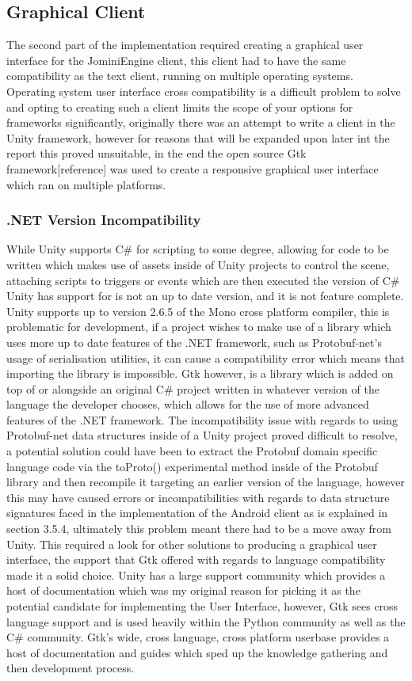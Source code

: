 \documentclass{article}
\begin{document}
\subsection{Graphical Client}
The second part of the implementation required creating a graphical user interface for the JominiEngine client, this client had to have the same compatibility as the text client, running on multiple operating systems. Operating system user interface cross compatibility is a difficult problem to solve and opting to creating such a client limits the scope of your options for frameworks significantly, originally there was an attempt to write a client in the Unity framework, however for reasons that will be expanded upon later int the report this proved unsuitable, in the end the open source Gtk framework[reference] was used to create a responsive graphical user interface which ran on multiple platforms.

\subsubsection{.NET Version Incompatibility}

While Unity supports C\# for scripting to some degree, allowing for code to be written which makes use of assets inside of Unity projects to control the scene, attaching scripts to triggers or events which are then executed the version of C\# Unity has support for is not an up to date version, and it is not feature complete. Unity supports up to version 2.6.5 of the Mono cross platform compiler, this is problematic for development, if a project wishes to make use of a library which uses more up to date features of the .NET framework, such as Protobuf-net’s usage of serialisation utilities, it can cause a compatibility error which means that importing the library is impossible. Gtk however, is a library which is added on top of or alongside an original C\# project written in whatever version of the language the developer chooses, which allows for the use of more advanced features of the .NET framework. The incompatibility issue with regards to using Protobuf-net data structures inside of a Unity project proved difficult to resolve, a potential solution could have been to extract the Protobuf domain specific language code via the toProto() experimental method inside of the Protobuf library and then recompile it targeting an earlier version of the language, however this may have caused errors or incompatibilities with regards to data structure signatures faced in the implementation of the Android client as is explained in section 3.5.4, ultimately this problem meant there had to be a move away from Unity. This required a look for other solutions to producing a graphical user interface, the support that Gtk offered with regards to language compatibility made it a solid choice. Unity has a large support community which provides a host of documentation which was my original reason for picking it as the potential candidate for implementing the User Interface, however, Gtk sees cross language support and is used heavily within the Python community as well as the C\# community. Gtk’s wide, cross language, cross platform userbase provides a host of documentation and guides which sped up the knowledge gathering and then development process.
\end{document}
